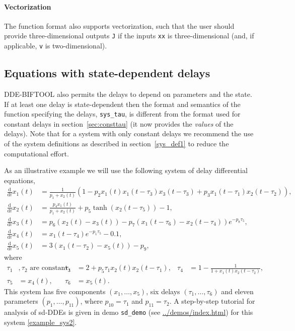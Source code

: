 \documentclass[10pt]{scrartcl}
\newcommand{\DDEBIFCODE}{\textsc{DDE-BIFTOOL}}
\newcommand{\demobase}{\url{../demos/index.html}}
\renewcommand{\d}{\mathrm{d}}
\newcommand{\blist}[1]{\mbox{\lstinline!#1!}}
\begin{document}
\paragraph{Vectorization} The function format also supports
vectorization, such that the user should provide three-dimensional
outputs \blist{J} if the inputs \blist{xx} is three-dimensional (and,
if applicable, \blist{v} is two-dimensional).

\subsection{Equations with state-dependent
  delays}\label{sys_def2}
\DDEBIFCODE{} also permits the delays to depend on parameters and the
state. If at least one delay is state-dependent then the format and
semantics of the function specifying the delays, \blist{sys_tau}, is
different from the format used for constant delays in
section~\ref{sec:consttau} (it now provides the \emph{values} of the
delays).  Note that for a system with only constant delays we
recommend the use of the system definitions as described in
section~\ref{sys_def1} to reduce the computational effort.

As an illustrative example we will use the following system of delay 
differential equations,
\begin{equation}\label{example_sys2}
  \begin{split}
    \frac{\d}{\d t}x_1(t)&=\frac{1}{p_1+x_2(t)}\left(1-p_2x_1(t)x_1(t-\tau_3)
      x_3(t-\tau_3)+p_3x_1(t-\tau_1)x_2(t-\tau_2)\right),\\
    \frac{\d}{\d t}x_2(t)&=\frac{p_4 x_1(t)}{p_1+x_2(t)}+
    p_5\tanh(x_2(t-\tau_5))-1,\\
    \frac{\d}{\d t}x_3(t)&=p_6(x_2(t)-x_3(t))-p_7(x_1(t-\tau_6)-x_2(t-\tau_4))e^{-p_8 \tau_5},\\
    \frac{\d}{\d t}x_4(t)&=x_1(t-\tau_4)e^{-p_1 \tau_5} -0.1,\\
    \frac{\d}{\d t}x_5(t)&=3(x_1(t-\tau_2)-x_5(t))-p_9,
  \end{split}
\end{equation}
where
\begin{align*}
\tau_1&, \tau_2 \mbox{\ are constant delays},&
\tau_3&=2+p_5\tau_1x_2(t)x_2(t-\tau_1),&
\tau_4&=1-\frac{1}{1+x_1(t)x_2(t-\tau_2)},\\
\tau_5&=x_4(t),&
\tau_6&=x_5(t).
\end{align*}
This system has five components $(x_1,\ldots,x_5)$, six delays
$(\tau_1,\ldots,\tau_6)$ and eleven parameters $(p_1,\ldots,p_{11})$,
where $p_{10}=\tau_1$ and $p_{11}=\tau_2$. A step-by-step tutorial
for analysis of sd-DDEs is given in demo \texttt{sd\_demo} (see
\demobase{}) for this system \eqref{example_sys2}.
\end{document}
